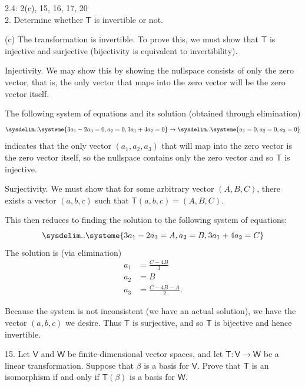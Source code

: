 \documentclass[11pt]{article}
\begin{document}
2.4: 2(c), 15, 16, 17, 20\\

2. Determine whether $\mathsf{T}$ is invertible or not.

(c) The transformation is invertible. To prove this, we must show that $\mathsf{T}$ is injective and surjective (bijectivity is equivalent to invertibility).

Injectivity. We may show this by showing the nullspace consists of only the zero vector, that is, the only vector that maps into the zero vector will be the zero vector itself. 

The following system of equations and its solution (obtained through elimination) \begin{equation*}
    \sysdelim..\systeme{
    3a_1 -2a_3 = 0,
    a_2 = 0,
    3a_1 + 4a_2 = 0 
    }\to
    \sysdelim..\systeme{
    a_1 = 0,
    a_2 = 0,
    a_3 = 0
    }
\end{equation*} indicates that the only vector $(a_1,a_2,a_3)$ that will map into the zero vector is the zero vector itself, so the nullspace contains only the zero vector and so $\mathsf{T}$ is injective.

Surjectivity. We must show that for some arbitrary vector $(A,B,C)$, there exists a vector $(a,b,c)$ such that $\mathsf{T}(a,b,c) = (A,B,C)$.

This then reduces to finding the solution to the following system of equations:
\begin{equation*}
    \sysdelim..\systeme{
    3a_1 -2a_3 = A,
    a_2 = B,
    3a_1 + 4a_2 = C 
    }
\end{equation*} The solution is (via elimination)
\begin{align*}
    a_1 &= \frac{C-4B}{3}\\
    a_2 &= B\\
    a_3 &= \frac{C-4B-A}{2}.
\end{align*}

Because the system is not inconsistent (we have an actual solution), we have the vector $(a,b,c)$ we desire. Thus $\mathsf{T}$ is surjective, and so $\mathsf{T}$ is bijective and hence invertible.

15. Let $\mathsf{V}$ and $\mathsf{W}$ be finite-dimensional vector spaces, and let $\mathsf{T} : \mathsf{V} \to \mathsf{W}$ be a linear transformation. Suppose that $\beta$ is a basis for $\mathsf{V}$. Prove that $\mathsf{T}$ is an isomorphism if and only if $\mathsf{T}(\beta)$ is a basis for $\mathsf{W}$.
\end{document}
